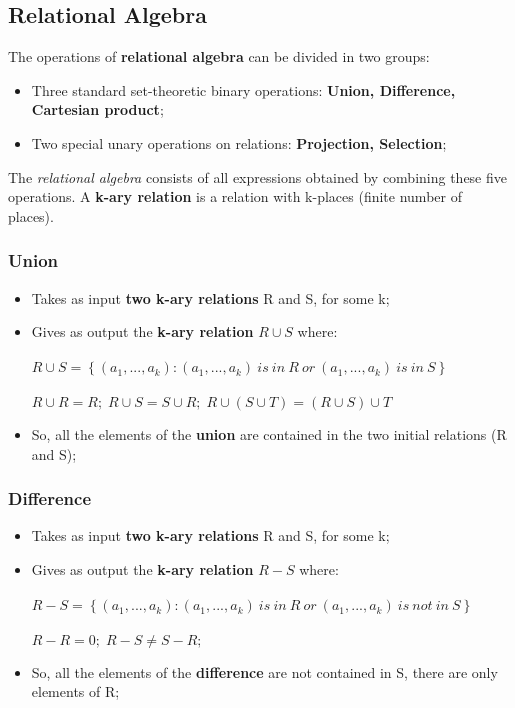 \documentclass{article}
\begin{document}
\subsection{Relational Algebra}
The operations of \textbf{relational algebra} can be divided in two groups:
\begin{itemize}
\item Three standard set-theoretic binary operations: \textbf{Union, Difference, Cartesian product};
\item Two special unary operations on relations: \textbf{Projection, Selection};
\end{itemize}
The \emph{relational algebra} consists of all expressions obtained by combining these five operations. A\textbf{ k-ary relation }is a relation with k-places (finite number of places). 
\subsubsection{Union}
\begin{itemize}
\item Takes as input \textbf{two k-ary relations} R and S, for some k;
\item Gives as output the\textbf{ k-ary relation} $ R \cup S $ where:\\\\
$R \cup S = \left \{ (a_{1},...,a_{k}): (a_{1},...,a_{k})\: is\: in\: R\: or\:(a_{1},...,a_{k})\: is\: in\: S \right \}$
\\\\
$R \cup R = R;\; R \cup S = S \cup R;\; R \cup (S \cup T) = (R \cup S) \cup T $
\item So, all the elements of the \textbf{union} are contained in the two initial relations (R and S);
\end{itemize}
\subsubsection{Difference}
\begin{itemize}
\item Takes as input \textbf{two k-ary relations} R and S, for some k;
\item Gives as output the \textbf{k-ary relation} $ R - S $ where:\\\\
$R - S = \left \{ (a_{1},...,a_{k}): (a_{1},...,a_{k})\: is\: in\: R\: or\:(a_{1},...,a_{k})\: is\: not\: in\: S \right \}$
\\\\
$R - R = 0;\; R - S \neq S - R; $
\item So, all the elements of the \textbf{difference} are not contained in S, there are only elements of R;
\end{itemize}
\end{document}

